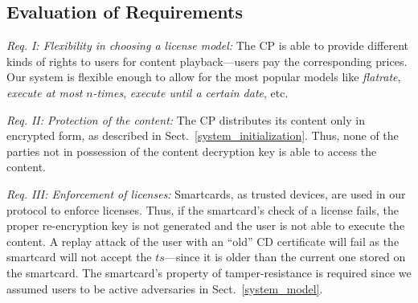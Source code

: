 \documentclass{llncs}
\newcommand{\refSec}[1]{Sect.~\ref{#1}}
\begin{document}
\subsection{Evaluation of Requirements}



\emph{Req. I: Flexibility in choosing a license model: } The CP is able to provide different kinds of rights to users for content playback---users pay the corresponding prices. Our system is flexible enough to allow for the most popular models like \emph{flatrate}, \emph{execute at most} $n$\emph{-times}, \emph{execute until a certain date}, etc.

\emph{Req. II: Protection of the content: } The CP distributes its content only in encrypted form, as described in \refSec{system_initialization}. Thus, none of the parties not in possession of the content decryption key is able to access the content. 

\emph{Req. III: Enforcement of licenses: } Smartcards, as trusted devices, are used in our protocol to enforce licenses. Thus, if the smartcard's check of a license fails, the proper re-encryption key is not generated and the user is not able to execute the content. A replay attack of the user with an ``old'' CD certificate will fail as the smartcard will not accept the $ts$---since it is older than the current one stored on the smartcard. The smartcard's property of tamper-resistance is required since we assumed users to be active adversaries in \refSec{system_model}. 
\end{document}
